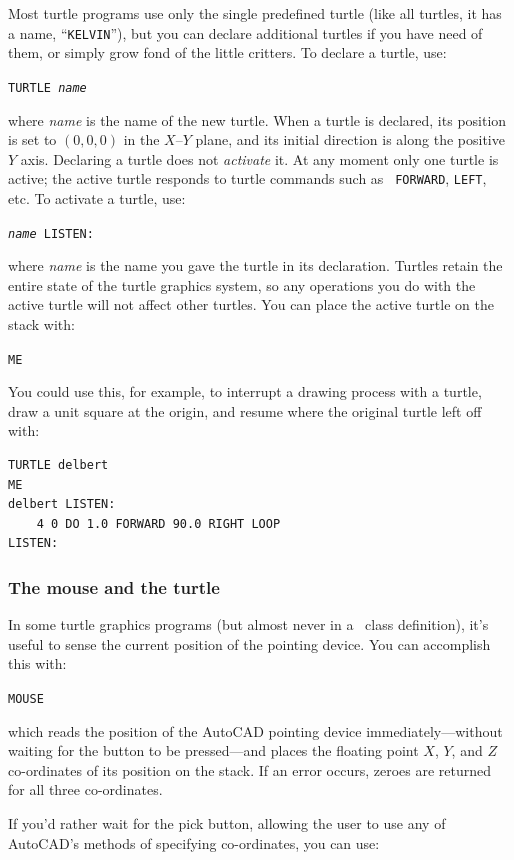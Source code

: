 \documentclass{article}
\begin{document}
Most turtle programs use only the single predefined turtle (like all
turtles, it has a name, ``{\tt KELVIN}''), but you can declare
additional turtles if you have need of them, or simply grow fond of
the little critters.  To declare a turtle, use:

{\tt TURTLE {\em name}}

where {\em name} is the name of the new turtle.  When a turtle is
declared, its position is set to $(0,0,0)$ in the $X$--$Y$ plane, and
its initial direction is along the positive $Y$ axis.  Declaring a
turtle does not {\em activate} it.  At any moment only one turtle is
active; the active turtle responds to turtle commands such as {\tt
FORWARD}, {\tt LEFT}, etc.  To activate a turtle, use:

{\tt {\em name} LISTEN:}

where {\em name} is the name you gave the turtle in its declaration.
Turtles retain the entire state of the turtle graphics system, so any
operations you do with the active turtle will not affect other
turtles.  You can place the active turtle on the stack with:

{\tt ME}

You could use this, for example, to interrupt a drawing process with a
turtle, draw a unit square at the origin, and resume where the
original turtle left off with:

\begin{verbatim}
TURTLE delbert
ME
delbert LISTEN:
    4 0 DO 1.0 FORWARD 90.0 RIGHT LOOP
LISTEN:
\end{verbatim}

\subsubsection{The mouse and the turtle}

In some turtle graphics programs (but almost never in a \cw\
class definition), it's useful to sense the current position of the
pointing device.  You can accomplish this with:

{\tt MOUSE}

which reads the position of the AutoCAD pointing device
immediately---without waiting for the button to be pressed---and
places the floating point $X$, $Y$, and $Z$ co-ordinates of its
position on the stack.  If an error occurs, zeroes are returned for
all three co-ordinates.

If you'd rather wait for the pick button, allowing the user to use
any of AutoCAD's methods of specifying co-ordinates, you can use:
\end{document}
